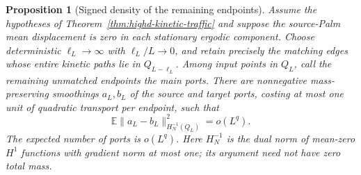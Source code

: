 \documentclass[11pt,reqno]{amsart}
\newtheorem{proposition}[theorem]{Proposition}
\theoremstyle{definition}
\theoremstyle{remark}
\numberwithin{equation}{section}
\newcommand{\E}{\mathbb E}
\begin{document}
\begin{proposition}[Signed density of the remaining endpoints]
\label{prop:highd-signed-ports}
Assume the hypotheses of Theorem~\ref{thm:highd-kinetic-traffic} and
suppose the source-Palm mean displacement is zero in each stationary
ergodic component. Choose deterministic \(\ell_L\to\infty\) with
\(\ell_L/L\to0\), and retain precisely the matching edges whose entire
kinetic paths lie in \(Q_{L-\ell_L}\). Among input points in \(Q_L\),
call the remaining unmatched endpoints the main ports.
There are nonnegative mass-preserving smoothings \(a_L,b_L\) of the
source and target ports, costing at most one unit of quadratic transport
per endpoint, such that
\begin{equation}
\label{eq:highd-port-neumann}
 \E\|a_L-b_L\|_{H_N^{-1}(Q_L)}^2=o(L^q).
\end{equation}
The expected number of ports is \(o(L^q)\). Here \(H_N^{-1}\) is the
dual norm of mean-zero \(H^1\) functions with gradient norm at most one;
its argument need not have zero total mass.
\end{proposition}
\end{document}
